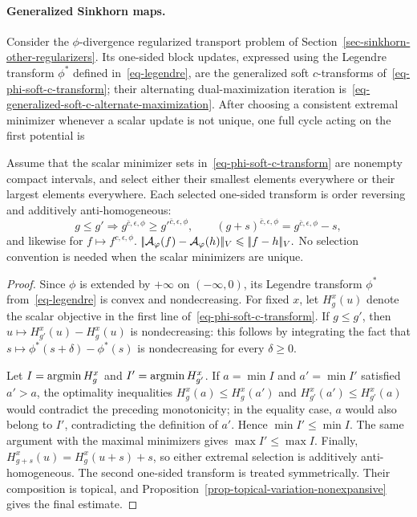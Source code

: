 \paragraph{Generalized Sinkhorn maps.}
Consider the $\phi$-divergence regularized transport problem of Section~\ref{sec-sinkhorn-other-regularizers}. Its one-sided block updates, expressed using the Legendre transform $\phi^*$ defined in~\eqref{eq-legendre}, are the generalized soft $c$-transforms of~\eqref{eq-phi-soft-c-transform}; their alternating dual-maximization iteration is~\eqref{eq-generalized-soft-c-alternate-maximization}. After choosing a consistent extremal minimizer whenever a scalar update is not unique, one full cycle acting on the first potential is
\begin{prop}\label{prop-phi-double-soft-transform-monotone}
Assume that the scalar minimizer sets in~\eqref{eq-phi-soft-c-transform} are nonempty compact intervals, and select either their smallest elements everywhere or their largest elements everywhere. Each selected one-sided transform is order reversing and additively anti-homogeneous:
\[
g\leq g'
\Longrightarrow
g^{\bar c,\epsilon,\phi}\geq {g'}^{\bar c,\epsilon,\phi},
\qquad
(g+s)^{\bar c,\epsilon,\phi}
=
g^{\bar c,\epsilon,\phi}-s,
\]
and likewise for $f\mapsto f^{c,\epsilon,\phi}$.
\(|\!| \mathcal A_\varphi(f)-\mathcal A_\varphi(h) |\!|_V \leqslant |\!| f-h |\!|_V.\)
No selection convention is needed when the scalar minimizers are unique.
\end{prop}
\begin{proof}
Since $\phi$ is extended by $+\infty$ on $(-\infty,0)$, its Legendre transform $\phi^*$ from~\eqref{eq-legendre} is convex and nondecreasing. For fixed $x$, let $H_g^x(u)$ denote the scalar objective in the first line of~\eqref{eq-phi-soft-c-transform}. If $g\leq g'$, then $u\mapsto H_{g'}^x(u)-H_g^x(u)$ is nondecreasing: this follows by integrating the fact that $s\mapsto\phi^*(s+\delta)-\phi^*(s)$ is nondecreasing for every $\delta\geq0$.

Let $I=\operatorname{argmin} H_g^x$ and $I'=\operatorname{argmin} H_{g'}^x$. If $a=\min I$ and $a'=\min I'$ satisfied $a'>a$, the optimality inequalities $H_g^x(a)\leq H_g^x(a')$ and $H_{g'}^x(a')\leq H_{g'}^x(a)$ would contradict the preceding monotonicity; in the equality case, $a$ would also belong to $I'$, contradicting the definition of $a'$. Hence $\min I'\leq\min I$. The same argument with the maximal minimizers gives $\max I'\leq\max I$. Finally, $H_{g+s}^x(u)=H_g^x(u+s)+s$, so either extremal selection is additively anti-homogeneous. The second one-sided transform is treated symmetrically. Their composition is topical, and Proposition~\ref{prop-topical-variation-nonexpansive} gives the final estimate.
\end{proof}
